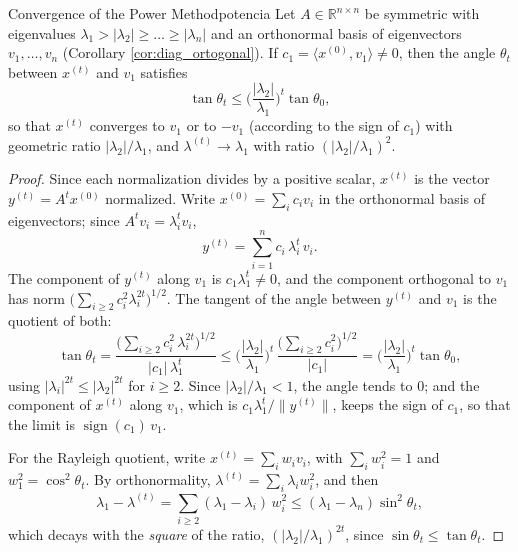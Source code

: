 \documentclass[11pt, a4paper]{article}
\begin{document}
\begin{teorema}{Convergence of the Power Method}{potencia}
Let $A \in \mathbb{R}^{n \times n}$ be symmetric with eigenvalues $\lambda_1 > |\lambda_2| \ge \dots \ge |\lambda_n|$ and an orthonormal basis of eigenvectors $v_1, \dots, v_n$ (Corollary \ref{cor:diag_ortogonal}). If $c_1 = \langle x^{(0)}, v_1 \rangle \neq 0$, then the angle $\theta_t$ between $x^{(t)}$ and $v_1$ satisfies
\[
\tan \theta_t \le \Big( \frac{|\lambda_2|}{\lambda_1} \Big)^{\! t} \tan \theta_0,
\]
so that $x^{(t)}$ converges to $v_1$ or to $-v_1$ (according to the sign of $c_1$) with geometric ratio $|\lambda_2| / \lambda_1$, and $\lambda^{(t)} \to \lambda_1$ with ratio $(|\lambda_2| / \lambda_1)^2$.
\end{teorema}

\begin{proof}
Since each normalization divides by a positive scalar, $x^{(t)}$ is the vector $y^{(t)} = A^t x^{(0)}$ normalized. Write $x^{(0)} = \sum_i c_i v_i$ in the orthonormal basis of eigenvectors; since $A^t v_i = \lambda_i^t v_i$,
\[
y^{(t)} = \sum_{i=1}^{n} c_i \, \lambda_i^t \, v_i.
\]
The component of $y^{(t)}$ along $v_1$ is $c_1 \lambda_1^t \neq 0$, and the component orthogonal to $v_1$ has norm $\big( \sum_{i \ge 2} c_i^2 \lambda_i^{2t} \big)^{1/2}$. The tangent of the angle between $y^{(t)}$ and $v_1$ is the quotient of both:
\[
\tan \theta_t = \frac{\big( \sum_{i \ge 2} c_i^2 \, \lambda_i^{2t} \big)^{1/2}}{|c_1| \, \lambda_1^t}
\le \Big( \frac{|\lambda_2|}{\lambda_1} \Big)^{\! t} \, \frac{\big( \sum_{i \ge 2} c_i^2 \big)^{1/2}}{|c_1|}
= \Big( \frac{|\lambda_2|}{\lambda_1} \Big)^{\! t} \tan \theta_0,
\]
using $|\lambda_i|^{2t} \le |\lambda_2|^{2t}$ for $i \ge 2$. Since $|\lambda_2| / \lambda_1 < 1$, the angle tends to $0$; and the component of $x^{(t)}$ along $v_1$, which is $c_1 \lambda_1^t / \|y^{(t)}\|$, keeps the sign of $c_1$, so that the limit is $\operatorname{sign}(c_1) \, v_1$.

For the Rayleigh quotient, write $x^{(t)} = \sum_i w_i v_i$, with $\sum_i w_i^2 = 1$ and $w_1^2 = \cos^2 \theta_t$. By orthonormality, $\lambda^{(t)} = \sum_i \lambda_i w_i^2$, and then
\[
\lambda_1 - \lambda^{(t)} = \sum_{i \ge 2} (\lambda_1 - \lambda_i) \, w_i^2 \le (\lambda_1 - \lambda_n) \sin^2 \theta_t,
\]
which decays with the \emph{square} of the ratio, $(|\lambda_2| / \lambda_1)^{2t}$, since $\sin \theta_t \le \tan \theta_t$.
\end{proof}
\end{document}
